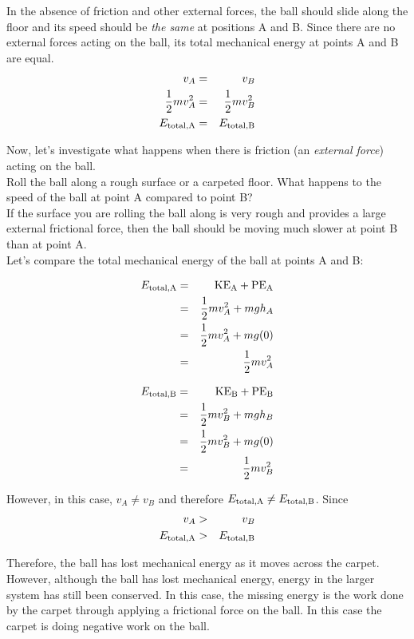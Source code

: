 {In the absence of friction and other external forces, the ball should slide along the floor and its speed should be \textit{the same} at positions A and B. Since there are no external forces acting on the ball, its total mechanical energy at points A and B are equal.\\

\begin{eqnarray*}
v_{A} & = & v_{B}\\
\frac{1}{2}mv_{A}^{2} & = & \frac{1}{2}mv_{B}^{2}\\
E_{\rm{total,A}}  & = & E_{\rm{total,B}} 
\end{eqnarray*}

Now, let's investigate what happens when there is friction (an \textit{external force}) acting on the ball.\\
Roll the ball along a rough surface or a carpeted floor. What happens to the speed of the ball at point A compared to point B? \\
If the surface you are rolling the ball along is very rough and provides a large external frictional force, then the ball should be moving much slower at point B than at point A. \\
Let's compare the total mechanical energy of the ball at points A and B: \\

\begin{minipage}{.49\textwidth}
\begin{eqnarray*}
E_{\rm{total,A}}  & = & \rm{KE}_{A} + \rm{PE}_{A}  \\
& = & \frac{1}{2}mv_{A}^{2} + mgh_{A} \\
& = & \frac{1}{2}mv_{A}^{2} + mg(0) \\
& = & \frac{1}{2}mv_{A}^{2} 
\end{eqnarray*}
\end{minipage}
\begin{minipage}{.49\textwidth}
\begin{eqnarray*}
E_{\rm{total,B}}  & = & \rm{KE}_{B} + \rm{PE}_{B}  \\
& = & \frac{1}{2}mv_{B}^{2} + mgh_{B} \\
& = & \frac{1}{2}mv_{B}^{2} + mg(0) \\
& = & \frac{1}{2}mv_{B}^{2} 
\end{eqnarray*}
\end{minipage}

However, in this case, $v_{A} \neq v_{B}$ and therefore $E_{\rm{total,A}}  \neq E_{\rm{total,B}} $. Since 
\begin{eqnarray*}
v_{A} & > & v_{B} \\
E_{\rm{total,A}}  & > &  E_{\rm{total,B}}
\end{eqnarray*}

Therefore, the ball has lost mechanical energy as it moves across the carpet. 
However, although the ball has lost mechanical energy, energy in the larger system has still been conserved. In this case, the missing
energy is the work done by the carpet through applying a frictional force on the ball. In this case the carpet is doing negative work on the ball. 
}

